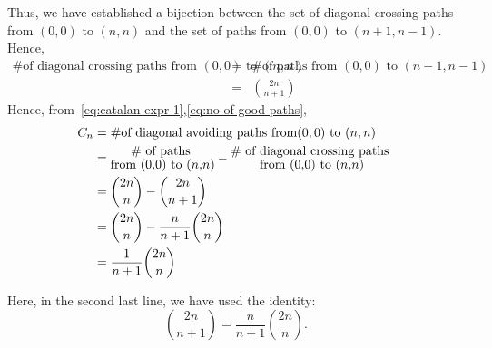 Thus, we have established a bijection between the set of diagonal crossing paths from $(0,0)$ to $(n,n)$ and the set of  paths from $(0,0)$ to $(n+1,n-1)$. Hence, 
\begin{eqnarray*}
    \# \text{of diagonal crossing paths from } (0,0) \text{ to } (n,n) &=& \# \text{of paths from } (0,0) \text{ to } (n+1,n-1)\\
    &= &{2n\choose n+1}
\end{eqnarray*}
Hence, from~\eqref{eq:catalan-expr-1},\eqref{eq:no-of-good-paths},
\begin{align*} %
C_n &= \# \text{of diagonal avoiding paths from} (0,0) \text{ to } (n,n)\\
     &= \Large \substack{\text{\# of paths }\\ \text{from } (0,0) \text{ to } (n,n)} - \Large\substack{\text{\# of diagonal crossing paths }\\ \text{from } (0,0) \text{ to } (n,n)}\\
    &= {2n\choose n} - {2n\choose n+1}\\
    & = {2n\choose n} - \frac{n}{n+1}{2n\choose n}\\
    &=\frac{1}{n+1}{2n\choose n}
\end{align*}  

Here, in the second last line, we have used the identity: $${2n\choose n+1} = \frac{n}{n+1}{2n\choose n}.$$









